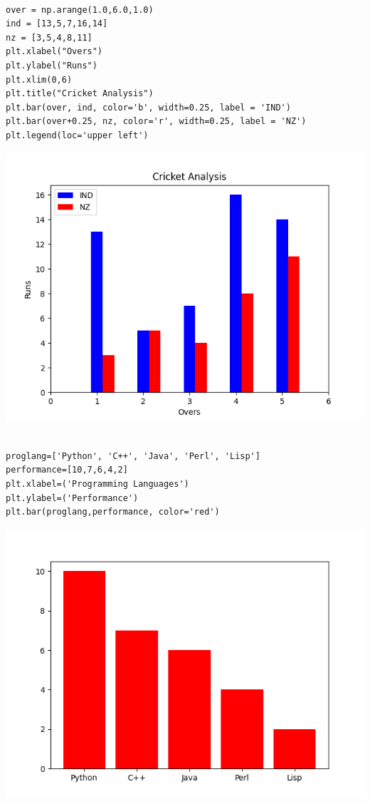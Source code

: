 \documentclass[11pt]{article}
\begin{document}
\newpage
\begin{verbatim}

over = np.arange(1.0,6.0,1.0)
ind = [13,5,7,16,14]
nz = [3,5,4,8,11]
plt.xlabel("Overs")
plt.ylabel("Runs")
plt.xlim(0,6)
plt.title("Cricket Analysis")
plt.bar(over, ind, color='b', width=0.25, label = 'IND')
plt.bar(over+0.25, nz, color='r', width=0.25, label = 'NZ')
plt.legend(loc='upper left')

\end{verbatim}

\begin{center}
\includegraphics[width=.9\linewidth]{fig4.png}
\end{center}

\newpage
\begin{verbatim}

proglang=['Python', 'C++', 'Java', 'Perl', 'Lisp']
performance=[10,7,6,4,2]
plt.xlabel=('Programming Languages')
plt.ylabel=('Performance')
plt.bar(proglang,performance, color='red')

\end{verbatim}

\begin{center}
\includegraphics[width=.9\linewidth]{fig5.png}
\end{center}
\end{document}
